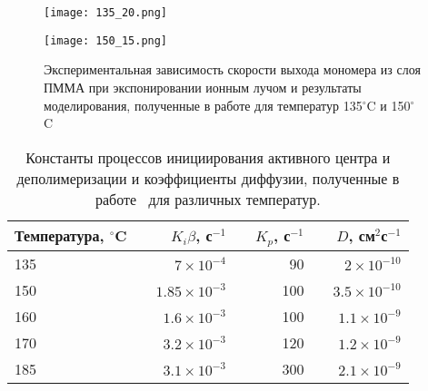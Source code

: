 \begin{figure}
	\begin{minipage}{0.48\textwidth}
		\texttt{[image: 135\_20.png]}
	\end{minipage}
	\begin{minipage}{0.48\textwidth}
		\texttt{[image: 150\_15.png]}
	\end{minipage}
	\caption{Экспериментальная зависимость скорости выхода мономера из слоя ПММА при экспонировании ионным лучом и результаты моделирования, полученные в работе для температур 135$^\circ$C и 150$^\circ$C~\cite{Fragala_3_diffusion}}
\end{figure}

\begin{table}[h]
	\begin{center}
	\caption{Константы процессов инициирования активного центра и деполимеризации и коэффициенты диффузии, полученные в работе~\cite{Fragala_3_diffusion} для различных температур.}
	\begin{tabular}{lc rc rc r}
		\hline \hline
		Температура, $^\circ$C & \hspace{4em} & $K_i \beta$, с$^{-1}$ & \hspace{1em} & $K_p$, с$^{-1}$ & \hspace{1em} & $D$, см$^2$с$^{-1}$ \\ \hline
		135 & \hspace{4em} & $7 \times 10^{-4}$ & \hspace{1em} & 90 & \hspace{1em} & $2 \times 10^{-10}$ \\  
		150 & \hspace{4em} & $1.85 \times 10^{-3}$ & \hspace{1em} & 100 & \hspace{1em} & $3.5 \times 10^{-10}$ \\
		160 & \hspace{4em} & $1.6 \times 10^{-3}$ & \hspace{1em} & 100 & \hspace{1em} & $1.1 \times 10^{-9}$ \\
		170 & \hspace{4em} & $3.2 \times 10^{-3}$ & \hspace{1em} & 120 & \hspace{1em} & $1.2\times10^{-9}$ \\
		185 & \hspace{4em} & $3.1 \times 10^{-3}$ & \hspace{1em} & 300 & \hspace{1em} & $2.1\times10^{-9}$ \\ \hline \hline
	\end{tabular}
	\label{table:Ki_Kp_D}
	\end{center}
\end{table}
